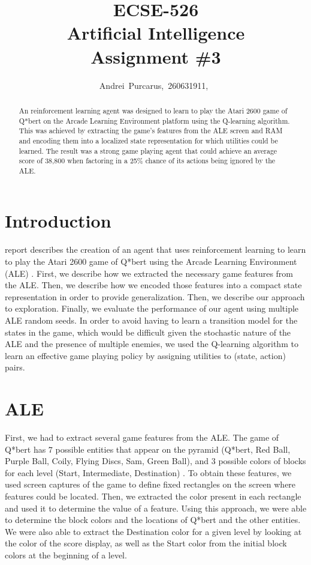 \documentclass[journal,hidelinks]{IEEEtran}
\title{ECSE-526 \\ Artificial Intelligence \\ Assignment \#3}
\author{Andrei~Purcarus,~260631911,~\IEEEmembership{McGill~University}}
\begin{document}
\sloppy

\maketitle

\begin{abstract}

An reinforcement learning agent was designed to learn to play the Atari 2600 game of Q*bert on the Arcade Learning Environment platform using the Q-learning algorithm. This was achieved by extracting the game's features from the ALE screen and RAM and encoding them into a localized state representation for which utilities could be learned. The result was a strong game playing agent that could achieve an average score of 38,800 when factoring in a 25\% chance of its actions being ignored by the ALE.

\end{abstract}

\section{Introduction}

 report describes the creation of an agent that uses reinforcement learning to learn to play the Atari 2600 game of Q*bert using the Arcade Learning Environment (ALE) \cite{bellemare_2013_arcade}. First, we describe how we extracted the necessary game features from the ALE. Then, we describe how we encoded those features into a compact state representation in order to provide generalization. Then, we describe our approach to exploration. Finally, we evaluate the performance of our agent using multiple ALE random seeds. In order to avoid having to learn a transition model for the states in the game, which would be difficult given the stochastic nature of the ALE and the presence of multiple enemies, we used the Q-learning algorithm to learn an effective game playing policy by assigning utilities to (state, action) pairs.

\section{ALE}

First, we had to extract several game features from the ALE. The game of Q*bert has $7$ possible entities that appear on the pyramid (Q*bert, Red Ball, Purple Ball, Coily, Flying Discs, Sam, Green Ball), and $3$ possible colors of blocks for each level (Start, Intermediate, Destination) \cite{greg_chance_atari_1997}. To obtain these features, we used screen captures of the game to define fixed rectangles on the screen where features could be located. Then, we extracted the color present in each rectangle and used it to determine the value of a feature. Using this approach, we were able to determine the block colors and the locations of Q*bert and the other entities. We were also able to extract the Destination color for a given level by looking at the color of the score display, as well as the Start color from the initial block colors at the beginning of a level.
\end{document}
